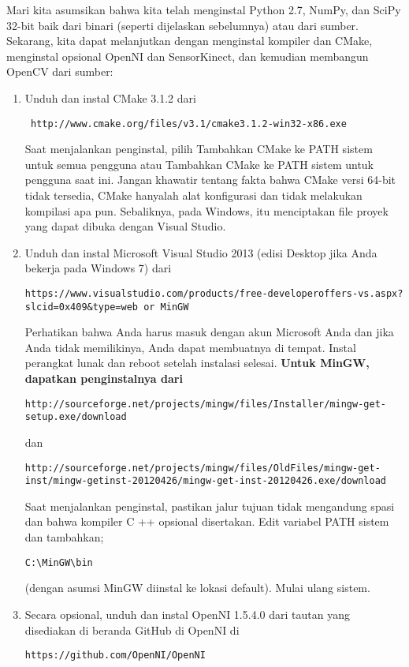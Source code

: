 Mari kita asumsikan bahwa kita telah menginstal Python 2.7, NumPy, dan SciPy 32-bit baik dari binari (seperti dijelaskan sebelumnya) atau dari sumber. Sekarang, kita dapat melanjutkan dengan menginstal kompiler dan CMake, menginstal opsional OpenNI dan SensorKinect, dan kemudian membangun OpenCV dari sumber:

\begin{enumerate}
	\item Unduh dan instal CMake 3.1.2 dari \begin{verbatim} http://www.cmake.org/files/v3.1/cmake3.1.2-win32-x86.exe \end{verbatim} Saat menjalankan penginstal, pilih Tambahkan CMake ke PATH sistem untuk semua pengguna atau Tambahkan CMake ke PATH sistem untuk pengguna saat ini. Jangan khawatir tentang fakta bahwa CMake versi 64-bit tidak tersedia, CMake hanyalah alat konfigurasi dan tidak melakukan kompilasi apa pun. Sebaliknya, pada Windows, itu menciptakan file proyek yang dapat dibuka dengan Visual Studio.
	\item Unduh dan instal Microsoft Visual Studio 2013 (edisi Desktop jika Anda bekerja pada Windows 7) dari \begin{verbatim}https://www.visualstudio.com/products/free-developeroffers-vs.aspx?slcid=0x409&type=web or MinGW \end{verbatim} Perhatikan bahwa Anda harus masuk dengan akun Microsoft Anda dan jika Anda tidak memilikinya, Anda dapat membuatnya di tempat. Instal perangkat lunak dan reboot setelah instalasi selesai. \textbf{Untuk MinGW, dapatkan penginstalnya dari} \begin{verbatim}http://sourceforge.net/projects/mingw/files/Installer/mingw-get-setup.exe/download \end{verbatim} dan \begin{verbatim}http://sourceforge.net/projects/mingw/files/OldFiles/mingw-get-inst/mingw-getinst-20120426/mingw-get-inst-20120426.exe/download \end{verbatim} Saat menjalankan penginstal, pastikan jalur tujuan tidak mengandung spasi dan bahwa kompiler C ++ opsional disertakan. Edit variabel PATH sistem dan tambahkan; \begin{verbatim}C:\MinGW\bin \end{verbatim} (dengan asumsi MinGW diinstal ke lokasi default). Mulai ulang sistem.
	\item Secara opsional, unduh dan instal OpenNI 1.5.4.0 dari tautan yang disediakan di beranda GitHub di OpenNI di \begin{verbatim}https://github.com/OpenNI/OpenNI \end{verbatim}

\end{enumerate}
